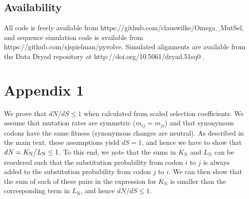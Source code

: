 \documentclass[11pt]{article}
\begin{document}
\subsection*{Availability}
All code is freely available from https://github.com/clauswilke/Omega\_MutSel, and sequence simulation code is available from https://github.com/sjspielman/pyvolve. Simulated alignments are available from the Data Dryad repository at http://doi.org/10.5061/dryad.51sq0 .


\section*{Appendix 1}
We prove that $dN/dS \leq 1$ when calculated from scaled selection coefficients. We assume that mutation rates are symmetric ($m_{ij} = m_{ji}$) and that synonymous codons have the same fitness (synonymous changes are neutral). As described in the main text, these assumptions yield $dS = 1$, and hence we have to show that $dN = K_\text{N}\big{/}L_\text{N} \leq 1$. To this end, we note that the sums in $K_\text{N}$ and $L_\text{N}$ can be reordered such that the substitution probability from codon $i$ to $j$ is always added to the substitution probability from codon $j$ to $i$. We can then show that the sum of each of these pairs in the expression for $K_\text{N}$ is smaller than the corresponding term in $L_\text{N}$, and hence $dN/dS \leq 1$.
\end{document}
